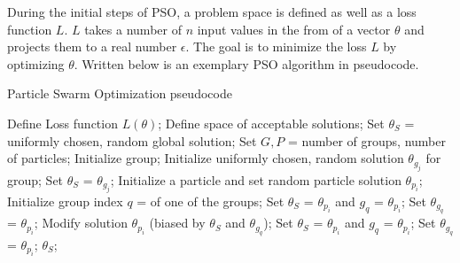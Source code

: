 During the initial steps of PSO, a problem space is defined as well as a loss function $L$. $L$ takes a number of $n$ input values in the from of a
vector $\theta$ and projects them to a real number $\epsilon$. The goal is to minimize the loss $L$ by optimizing $\theta$.
Written below is an exemplary PSO algorithm in  pseudocode.

\begin{algorithm}
	\caption{Particle Swarm Optimization pseudocode}
	\begin{algorithmic}
		\State Define Loss function $L(\theta)$;
		\State Define space of acceptable solutions;
		\State Set $\theta_S$ = uniformly chosen, random global solution;
		\State Set $G, P$ = number of groups, number of particles;
			\State Initialize group;
			\State Initialize uniformly chosen, random solution $\theta_{g_j}$ for group;
				\State Set $\theta_S$ = $\theta_{g_j}$;
			\EndIf
		\EndFor
			\State Initialize a particle and set random particle solution $\theta_{p_i}$;
			\State Initialize group index $q$ = of one of the groups;
				\State Set $\theta_S$ = $\theta_{p_i}$ and $g_q$ = $\theta_{p_i}$;
				\State Set $\theta_{g_q}$ = $\theta_{p_i}$;
			\EndIf
		\EndFor
				\State Modify solution $\theta_{p_i}$ (biased by $\theta_S$ and $\theta_{g_q}$);
					\State Set $\theta_S$ = $\theta_{p_i}$ and $g_q$ = $\theta_{p_i}$;
					\State Set $\theta_{g_q}$ = $\theta_{p_i}$;
				\EndIf
			\EndFor
		\EndWhile
		\State {} $\theta_S$;
	\end{algorithmic}
\end{algorithm}

